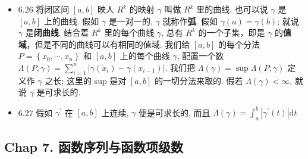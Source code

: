 \begin{itemize}
\item 6.26 将闭区间 $[a, b]$ 映人 $R^{k}$ 的映射 $\gamma$ 叫做 $R^{k}$ 里的曲线. 也可以说 $\gamma$ 是 $[a , b]$ 上的曲线. 假如 $\gamma$ 是一对一的, $\gamma$ 就称作\textbf{弧}. 假如 $\gamma(a)=\gamma(b)$; 就说 $\gamma$ 是\textbf{闭曲线}. 结合着 $R^{k}$ 里的每个曲线 $\gamma$, 总有 $R^{k}$ 的一个子集，即是 $\gamma$ 的\textbf{值域}，但是不同的曲线可以有相同的值域.
我们给 $[a, b]$ 的每个分法 $P=\left\{x_{0}, \cdots, x_{n}\right\}$ 和 $[a, b]$ 上的每个曲线 $\gamma$, 配置一个数 $\Lambda(P, \gamma)=\sum_{i=1}^{n}\left|\gamma\left(x_{i}\right)-\gamma\left(x_{i-1}\right)\right|$. 我们把 $\Lambda(\gamma)=\sup \Lambda(P, \gamma)$
定义作 $\gamma$ 之长; 这里的 sup 是对 $[a, b]$ 的一切分法来取的. 假若 $\Lambda(\gamma)<\infty$, 就说 $\gamma$ 是可求长的.

\item 6.27 假如 $\gamma^{\prime}$ 在 $[a, b]$ 上连续, $\gamma$ 便是可求长的, 而且 $\Lambda(\gamma)=\int_{a}^{b}\left|\gamma^{\prime}(t)\right| \mathrm{d} t$
\end{itemize}

\subsection{Chap 7. 函数序列与函数项级数}

